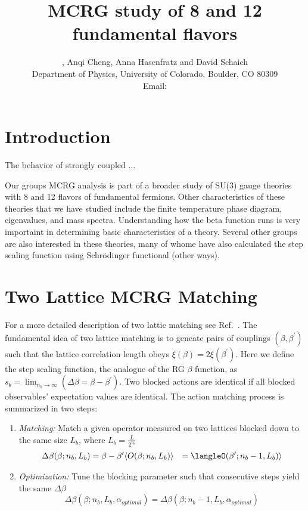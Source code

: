 \documentclass{PoS}
\title{MCRG study of 8 and 12 fundamental flavors}
\author{\speaker{Gregory Petropoulos}, Anqi Cheng, Anna Hasenfratz and David Schaich \\
  Department of Physics, University of Colorado, Boulder, CO 80309 \\
  Email: \email{gregory.petropoulos@colorado.edu}
}
\newcommand{\refcite}[1]{Ref.~\cite{#1}}
\begin{document}
\section{Introduction}
The behavior of strongly coupled ...

Our groups MCRG analysis is part of a broader study of SU(3) gauge theories with 8 and 12 flavors of fundamental fermions.
Other characteristics of these theories that we have studied include the finite temperature phase diagram, eigenvalues, and mass spectra.
Understanding how the beta function runs is very importaint in determining basic characteristics of a theory.
Several other groups are also interested in these theories, many of whome have also calculated the step scaling function using Schr\"odinger functional (other ways).

\section{Two Lattice MCRG Matching}
For a more detailed description of two lattic matching see \refcite{annaMCRG}.
The fundamental idea of two lattice matching is to geneate pairs of couplings $(\beta, \beta^{\prime})$ such that the lattice correlation length obeys $\xi(\beta)=2\xi(\beta^{\prime})$.
Here we define the step scaling function, the analogue of the RG $\beta$ function, as $s_b= \lim_{n_b\to\infty}(\Delta\beta=\beta - \beta^{\prime})$.
Two blocked actions are identical if all blocked observables' expectation values are identical.
The action matching process is summarized in two steps:

\begin{enumerate}
  \item \emph{Matching:}  Match a given operator measured on two lattices blocked down to the same size $L_b$, where $L_b=\frac{L}{2^{n_b}}$
  \begin{align}
    \Delta\beta(\beta;n_b,L_b) & = \beta-\beta^{\prime}
    \langle O(\beta;n_b,L_b)\rangle & = \langleO(\beta^{\prime};n_b-1,L_b)\rangle
  \end{align}
  \item \emph{Optimization:}  Tune the blocking parameter such that consecutive steps yield the same $\Delta\beta$
  \begin{equation}
    \Delta\beta(\beta;n_b,L_b,\alpha_{optimal})=\Delta\beta(\beta;n_b-1,L_b,\alpha_{optimal})
  \end{equation}
\end{enumerate}
\end{document}
